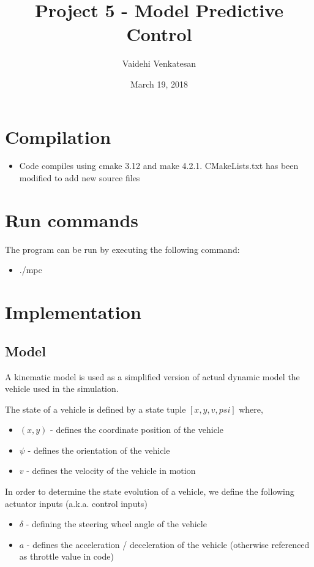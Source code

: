 \documentclass[12pt]{article}
\title{Project 5 - Model Predictive Control}
\author{Vaidehi Venkatesan}
\date{March 19, 2018}
\begin{document}
\maketitle

\section{Compilation}
\begin{itemize}
  \item Code compiles using cmake 3.12 and make 4.2.1. \itemThe CMakeLists.txt has been modified to add new source files 
\end{itemize}

\section{Run commands}
The program can be run by executing the following command:
\begin{itemize}
  \item ./mpc
\end{itemize}

\section{Implementation}
\subsection{Model}
A kinematic model is used as a simplified version of actual dynamic model the vehicle used in the simulation. 

The state of a vehicle is defined by a state tuple $[x,y,v,psi]$ where, 
\begin{itemize}
  \item $(x,y)$ - defines the coordinate position of the vehicle 
  \item $\psi$ - defines the orientation of the vehicle  
  \item $v$   - defines the velocity of the vehicle in motion
\end{itemize}

In order to determine the state evolution of a vehicle, we define the following actuator inputs (a.k.a. control inputs)
\begin{itemize}
  \item $\delta$ - defining the steering wheel angle of the vehicle 
  \item $a$     - defines the acceleration / deceleration of the vehicle (otherwise referenced as throttle value in code)
\end{itemize}
\end{document}
